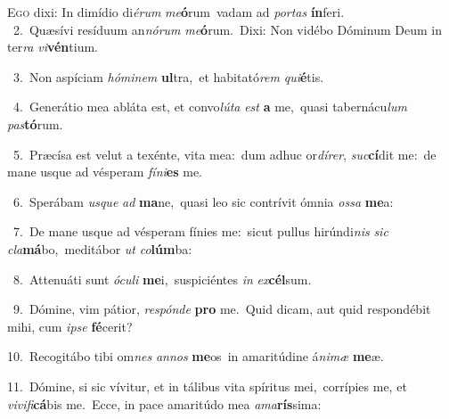 \lettrine{\initial\textcolor{\initialcolor}{E}}{go} dixi: In dimídio di\-\textit{é}\-\textit{rum} \textit{me}\-\textbf{ó}rum~\star vadam ad \textit{por}\-\textit{tas} \textbf{ín}\-feri.\\
{\numbfont\textcolor{\numbcolor}{~2.}}~Quæsívi resíduum an\-\textit{nó}\-\textit{rum} \textit{me}\-\textbf{ó}rum.~\star Dixi: Non vidébo Dóminum Deum in ter\textit{ra} \textit{vi}\-\textbf{vén}tium.\par
{\numbfont\textcolor{\numbcolor}{~3.}}~Non aspíciam \textit{hó}\-\textit{mi}\textit{nem} \textbf{ul}\-tra,~\star et habitató\textit{rem} \textit{qui}\-\textbf{é}tis.\par
{\numbfont\textcolor{\numbcolor}{~4.}}~Generátio mea abláta est, et convo\-\textit{lú}\-\textit{ta} \textit{est} \textbf{a} me,~\star quasi tabernácu\textit{lum} \textit{pas}\-\textbf{tó}rum.\par
{\numbfont\textcolor{\numbcolor}{~5.}}~Præcísa est velut a texénte, vita mea:~\dagger dum adhuc or\-\textit{dí}\-\textit{rer}, \textit{suc}\-\textbf{cí}dit me:~\star de mane usque ad vésperam \textit{fí}\-\textit{ni}\textbf{es} me.\par
{\numbfont\textcolor{\numbcolor}{~6.}}~Sperábam \textit{us}\-\textit{que} \textit{ad} \textbf{ma}\-ne,~\star quasi leo sic contrívit ómnia \textit{os}\-\textit{sa} \textbf{me}\-a:\par
{\numbfont\textcolor{\numbcolor}{~7.}}~De mane usque ad vésperam fínies me:~\dagger sicut pullus hirúndi\textit{nis} \textit{sic} \textit{cla}\-\textbf{má}bo,~\star meditábor \textit{ut} \textit{co}\-\textbf{lúm}ba:\par
{\numbfont\textcolor{\numbcolor}{~8.}}~Attenuáti sunt \textit{ó}\-\textit{cu}\textit{li} \textbf{me}\-i,~\star suspiciéntes \textit{in} \textit{ex}\-\textbf{cél}sum.\par
{\numbfont\textcolor{\numbcolor}{~9.}}~Dómine, vim pátior, \textit{re}\-\textit{spón}\textit{de} \textbf{pro} me.~\star Quid dicam, aut quid respondébit mihi, cum \textit{ip}\-\textit{se} \textbf{fé}\-cerit?\par
{\numbfont\textcolor{\numbcolor}{10.}}~Recogitábo tibi om\textit{nes} \textit{an}\-\textit{nos} \textbf{me}\-os~\star in amaritúdine á\-\textit{ni}\-\textit{mæ} \textbf{me}\-æ.\par
{\numbfont\textcolor{\numbcolor}{11.}}~Dómine, si sic vívitur, et in tálibus vita spíritus mei,~\dagger corrípies me, et \textit{vi}\-\textit{vi}\textit{fi}\textbf{cá}bis me.~\star Ecce, in pace amaritúdo mea \textit{a}\-\textit{ma}\textbf{rís}sima:\par
